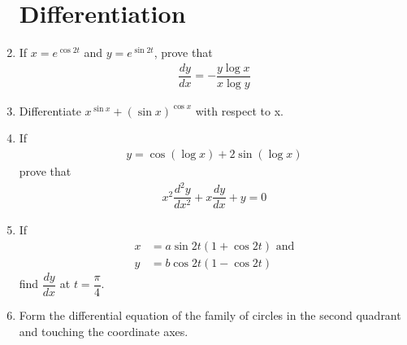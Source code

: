 \documentclass[12pt,-letter paper]{article}
\theoremstyle{remark}
\providecommand{\brak}[1]{\ensuremath{\left(#1\right)}}
\begin{document}
\begin{enumerate}
            \section{Differentiation}
      \item If $x=e^{\cos 2t}$ and $y=e^{\sin 2t}$, prove that
            \begin{align*}
                  \dfrac{dy}{dx}= -\dfrac{y \log x}{x \log y}
            \end{align*}
      \item Differentiate $x^{\sin x}+ \brak{\sin x}^{\cos x}$ with respect to x.
      \item If
            \begin{align*}
                  y=\cos \brak{\log x} + 2 \sin \brak{\log x}
            \end{align*}
            prove that
            \begin{align*}
                  x^2 \dfrac{d^2 y}{dx^2} + x \dfrac{dy}{dx} +y =0
            \end{align*}
      \item If
            \begin{align*}
                  x & =a\sin 2t\brak{1+\cos 2t} \text{ and} \\
                  y & =b\cos 2t\brak{1-\cos 2t}
            \end{align*}
            find $\dfrac{dy}{dx}$ at $t=\dfrac{\pi}{4}$.
      \item Form the differential equation of the family of circles in the second quadrant and touching the coordinate axes.

\end{enumerate}
\end{document}
